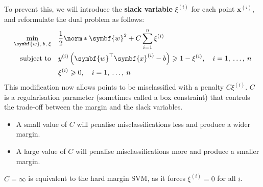 \documentclass{article}
\begin{document}
To prevent this, we will introduce the \textbf{slack variable}
\(\xi^{\left( i \right)}\) for each point \(\symbf{x}^{\left( i
\right)}\), and reformulate the dual problem as follows:
\begin{align*}
    \min_{\symbf{w},\: b,\: \xi} \quad & \frac{1}{2}\norm*{\symbf{w}}^2 + C \sum_{i = 1}^n \xi^{\left( i \right)}                                                                            \\
    \text{subject to} \quad            & y^{\left( i \right)} \left( \symbf{w}^\top \symbf{x}^{\left( i \right)} - b \right) \geqslant 1 - \xi^{\left( i \right)}, \quad i = 1,\: \dots,\: n \\
                                       & \xi^{\left( i \right)} \geqslant 0, \quad i = 1,\: \dots,\: n
\end{align*}
This modification now allows points to be misclassified with a penalty
\(C \xi^{\left( i \right)}\). \(C\) is a regularisation parameter
(sometimes called a box constraint) that controls the trade-off
between the margin and the slack variables.
\begin{itemize}
    \item A small value of \(C\) will penalise misclassifications less
          and produce a wider margin.
    \item A large value of \(C\) will penalise misclassifications more
          and produce a smaller margin.
\end{itemize}
\(C = \infty\) is equivalent to the hard margin SVM, as it forces
\(\xi^{\left( i \right)} = 0\) for all \(i\).
\end{document}
